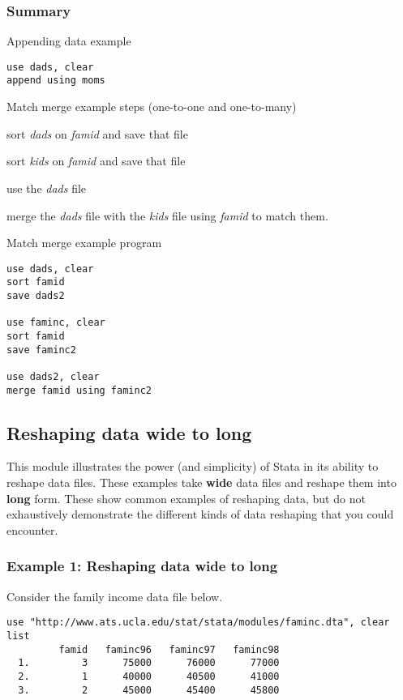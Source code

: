 \subsubsection{Summary}
\begin{compactitem}
\item Appending data example
\begin{lstlisting}
use dads, clear
append using moms
\end{lstlisting}
\item Match merge example steps (one-to-one and one-to-many)
\begin{compactenum}
\item sort \textit{dads} on \textit{famid} and save that file
\item sort \textit{kids} on \textit{famid} and save that file
\item use the \textit{dads} file
\item merge the \textit{dads} file with the \textit{kids} file using \textit{famid} to match them.
\end{compactenum}
\item Match merge example program
\begin{lstlisting}
use dads, clear
sort famid
save dads2

use faminc, clear
sort famid
save faminc2

use dads2, clear
merge famid using faminc2
\end{lstlisting}
\end{compactitem}


\subsection{Reshaping data wide to long}

This module illustrates the power (and simplicity) of Stata in its ability to reshape data files. These examples take \textbf{wide} data files and reshape them into \textbf{long} form. These show common examples of reshaping data, but do not exhaustively demonstrate the different kinds of data reshaping that you could encounter.

\subsubsection{Example 1: Reshaping data wide to long}
Consider the family income data file below.

\begin{lstlisting}
use "http://www.ats.ucla.edu/stat/stata/modules/faminc.dta", clear
list
         famid   faminc96   faminc97   faminc98
  1.         3      75000      76000      77000
  2.         1      40000      40500      41000
  3.         2      45000      45400      45800
\end{lstlisting}

